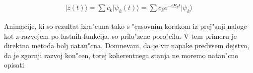 \documentclass[a4paper,10pt]{article}
\begin{document}
\begin{align}
|z(t)\rangle = \sum c_k |\psi_k(t) \rangle = \sum c_k e^{-iE_kt} |\psi_k\rangle
\end{align}

Animacije, ki so rezultat izra"cuna tako s "casovnim korakom iz prej"snji naloge kot z razvojem po lastnih funkcija, so prilo"zene poro"cilu. V tem primeru je direktna metoda bolj natan"cna. Domnevam, da je vir napake predvsem dejstvo, da je zgornji razvoj kon"cen, torej koherentnega stanja ne moremo natan"cno opisati. 
\end{document}
